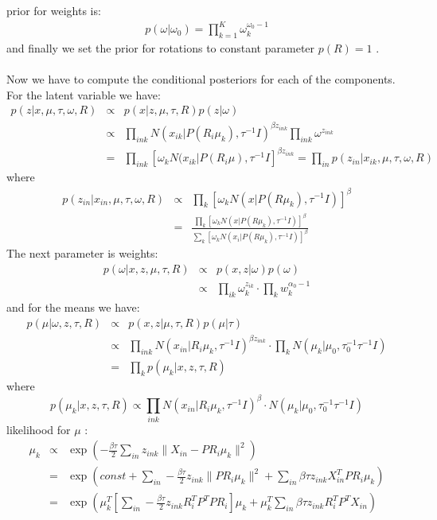 \documentclass[11pt]{article}
\begin{document}
prior for weights is:
\begin{eqnarray*}
p(\omega|\omega_0)=\prod_{k=1}^K\omega_k^{ \omega_0-1}
\end{eqnarray*}
and finally we set the prior for rotations to constant parameter $ p(R)=1$ .
\\\\
Now we have to compute the conditional posteriors for each of the components.\\
For the latent variable we have:
\begin{eqnarray*}
p(z|x,\mu,\tau,\omega,R)  &\propto &  p(x|z,\mu,\tau,R)p(z|\omega) \\ 
 &\propto & \prod_{ink} N(x_{ik}|P(R_i\mu_k),\tau^{-1}I)^{\beta z_{ink}}\prod_{ink}\omega^{z_{ink}} \\ 
&=& \prod_{ink}[\omega_kN(x_{ik}|P(R_i\mu),\tau^{-1}I]^{\beta z_{ink}}=\prod_{in}p(z_{in}|x_{ik},\mu,\tau,\omega,R) 
\end{eqnarray*}
where
\begin{eqnarray*}
p(z_{in}|x_{in},\mu,\tau,\omega,R)  &\propto & \prod_{k} [\omega_k N(x|P(R\mu_k),\tau^{-1}I)]^\beta  \\
&=& \frac{\prod_{k} [\omega_k N(x|P(R\mu_k),\tau^{-1}I)]^\beta }{\sum_{k} [\omega_k N(x_i|P(R\mu_k),\tau^{-1}I)]^\beta }
\end{eqnarray*} 
The next parameter is weights:
\begin{eqnarray*}
p(\omega | x,z,\mu,\tau,R) &\propto& p(x,z|\omega) p(\omega) \\
&\propto& \prod_{ik}\omega_k^{z_{ik}}\cdot\prod_kw_k^{\alpha_0-1}
\end{eqnarray*}
and for the means we have:
\begin{eqnarray*}
p(\mu|\omega,z,\tau,R) &\propto & p(x,z| \mu,\tau,R)p(\mu | \tau)\\
&\propto & \prod_{ink}N(x_{in} | R_i\mu_k, \tau^{-1}I)^{\beta z_{ink}}\cdot \prod_kN(\mu_k | \mu_0, \tau_0^{-1} \tau^{-1}I)\\
& =& \prod_kp(\mu_k|x,z,\tau,R)
\end{eqnarray*}
where
\begin{equation*}
p(\mu_k|x,z,\tau,R) \propto \prod_{ink}N(x_{in}|R_i\mu_k,\tau^{-1}I)^\beta  \cdot N(\mu_k|\mu_0,\tau_0^{-1}\tau^{-1}I)
\end{equation*} 
likelihood for $\mu$ :
\begin{eqnarray*}
\mu_k &\propto & \exp(-\frac{\beta \tau}{2} \sum_{in}z_{ink}\|X_{in}-PR_i\mu_k\|^2) \\
&=& \exp(const + \sum_{in} -\frac{\beta \tau}{2} z_{ink}\|PR_i\mu_k\|^2 + \sum_{in}{\beta \tau}z_{ink}X_{in}^TPR_i\mu_k )\\
&=& \exp( \mu_k^T[\sum_{in}-\frac{\beta \tau}{2}z_{ink}R_i^{T}P^TPR_i]\mu_k+\mu_k^T\sum_{in}{\beta \tau}z_{ink}R_i^TP^TX_{in})
\end{eqnarray*}
\end{document}
